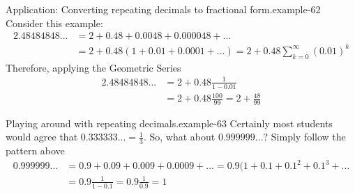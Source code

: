 \documentclass[10pt,]{book}
\numberwithin{equation}{section}
\begin{document}
\begin{example}{Application: Converting repeating decimals to fractional form.}{example-62}%
\hypertarget{p-1446}{}%
Consider this example:%
%
\begin{align*}
2.48484848... & = 2 + 0.48 + 0.0048 + 0.000048 + ...\\
&  = 2 + 0.48(1 + 0.01 + 0.0001 + ... ) = 2 + 0.48 \sum_{k=0}^\infty (0.01)^k
\end{align*}
\hypertarget{p-1447}{}%
Therefore, applying the Geometric Series%
%
\begin{align*}
2.48484848... & = 2 + 0.48 \frac{1}{1-0.01} \\
& = 2 + 0.48 \frac{100}{99} = 2 + \frac{48}{99} 
\end{align*}
\end{example}
\begin{example}{Playing around with repeating decimals.}{example-63}%
\hypertarget{p-1448}{}%
Certainly most students would agree that \(0.333333... = \frac{1}{3} \). So, what about \(0.999999...\)? Simply follow the pattern above%
%
\begin{align*}
0.999999... & = 0.9 + 0.09 + 0.009 + 0.0009 + ... = 0.9(1 + 0.1 + 0.1^2 + 0.1^3 + ...\\
& = 0.9 \frac{1}{1-0.1} = 0.9 \frac{1}{0.9} = 1 
\end{align*}
\end{example}
%
%
\typeout{************************************************}
\typeout{************************************************}
%
\end{document}
